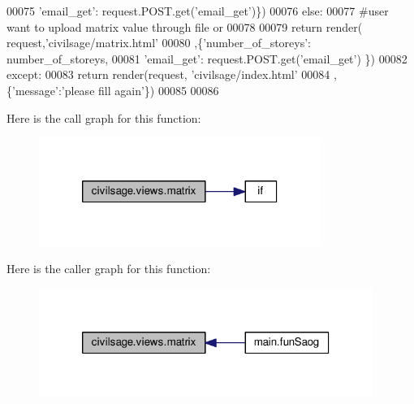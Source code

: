 \begin{DoxyCode}
00075             \textcolor{stringliteral}{'email\_get'}: request.POST.get(\textcolor{stringliteral}{'email\_get'})\})
00076         \textcolor{keywordflow}{else}:
00077         \textcolor{comment}{#user want to upload matrix value through file or}
00078         
00079             \textcolor{keywordflow}{return} render( request,\textcolor{stringliteral}{'civilsage/matrix.html'}
00080             ,\{\textcolor{stringliteral}{'number\_of\_storeys'}: number\_of\_storeys,
00081             \textcolor{stringliteral}{'email\_get'}: request.POST.get(\textcolor{stringliteral}{'email\_get'}) \})
00082     \textcolor{keywordflow}{except}:
00083         \textcolor{keywordflow}{return} render(request, \textcolor{stringliteral}{'civilsage/index.html'}
00084         ,\{\textcolor{stringliteral}{'message'}:\textcolor{stringliteral}{'please fill again'}\})
00085 
00086 
\end{DoxyCode}


Here is the call graph for this function\+:\nopagebreak
\begin{figure}[H]
\begin{center}
\leavevmode
\includegraphics[width=260pt]{namespacecivilsage_1_1views_a8b58c93a9c82e84143c43dafaa744a4b_cgraph}
\end{center}
\end{figure}




Here is the caller graph for this function\+:\nopagebreak
\begin{figure}[H]
\begin{center}
\leavevmode
\includegraphics[width=308pt]{namespacecivilsage_1_1views_a8b58c93a9c82e84143c43dafaa744a4b_icgraph}
\end{center}
\end{figure}


